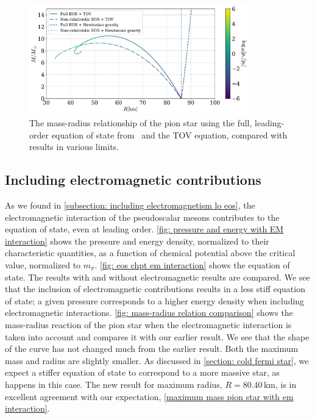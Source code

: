 \begin{figure}[H]
    \centering
    \includegraphics[width=0.85\textwidth]{../scripts/figurer/pion_star/mass_radius_comparison.pdf}
    \caption{
        The mass-radius relationship of the pion star using the full, leading-order equation of state from \chpt\, and the TOV equation, compared with results in various limits.
        }
        \label{fig: mass-radius relation pion star comparison}
\end{figure}




\subsection{Including electromagnetic contributions}

As we found in \autoref{subsection: including electromagnetism lo eos}, the electromagnetic interaction of the pseudoscalar mesons contributes to the equation of state, even at leading order.
\autoref{fig: pressure and energy with EM interaction} shows the pressure and energy density, normalized to their characteristic quantities, as a function of chemical potential above the critical value, normalized to $m_\pi$.
\autoref{fig: eos chpt em interaction} shows the equation of state.
The results with and without electromagnetic results are compared.
We see that the inclusion of electromagnetic contributions results in a less stiff equation of state; a given pressure corresponds to a higher energy density when including electromagnetic interactions.
\autoref{fig: mass-radius relation comparison} shows the mass-radius reaction of the pion star when the electromagnetic interaction is taken into account and compares it with our earlier result.
We see that the shape of the curve has not changed much from the earlier result. 
Both the maximum mass and radius are slightly smaller.
As discussed in \autoref{section: cold fermi star}, we expect a stiffer equation of state to correspond to a more massive star, as happens in this case.
The new result for maximum radius, $R = 80.40 \, \text{km}$, is in excellent agreement with our expectation, \autoref{maximum mass pion star with em interaction}.


